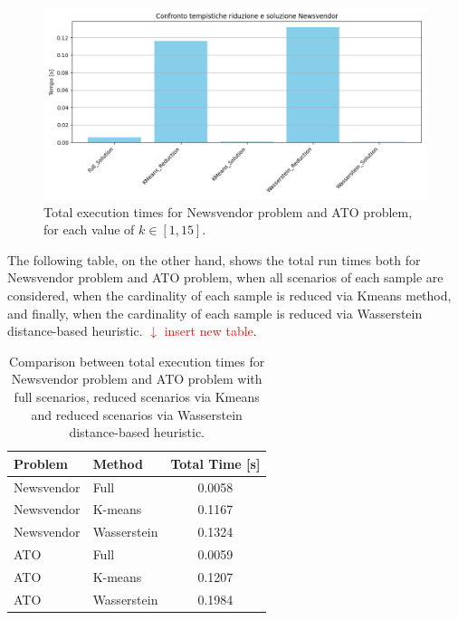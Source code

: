 \documentclass[a4paper,12pt]{article}
\begin{document}
	\begin{figure}[H]
		\centering
		\includegraphics[width=1\textwidth]{../immagini/tempiNV.png}
		\caption{Total execution times for Newsvendor problem and ATO problem, for each value of $k \in [1,15]$.}
		\label{fig:timing}
	\end{figure}
	
	
	\noindent The following table, on the other hand, shows the total run times both for Newsvendor problem and ATO problem, when all scenarios of each sample are considered, when the cardinality of each sample is reduced via Kmeans method, and finally, when the cardinality of each sample is reduced via Wasserstein  distance-based heuristic. \textcolor{red}{$\downarrow$ insert new table}.
	
	\begin{table}[htbp]
		\centering
		\begin{tabular}{|l|l|c|}
			\hline
			\textbf{Problem} & \textbf{Method} & \textbf{Total Time [s]} \\
			\hline
			Newsvendor & Full           & 0.0058 \\
			Newsvendor & K-means        & 0.1167 \\
			Newsvendor & Wasserstein    & 0.1324 \\
			\hline
			ATO        & Full           & 0.0059 \\
			ATO        & K-means        & 0.1207 \\
			ATO        & Wasserstein    & 0.1984 \\
			\hline
		\end{tabular}
		\label{tab:summary-times}
		\caption{Comparison between total execution times for Newsvendor problem and ATO problem with full scenarios, reduced scenarios via Kmeans and reduced scenarios via Wasserstein distance-based heuristic.}
		
	\end{table}
	
\end{document}
